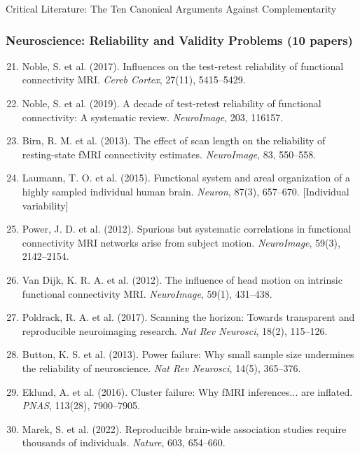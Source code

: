 \begin{chapter}{Critical Literature: The Ten Canonical Arguments Against Complementarity}
\subsubsection{Neuroscience: Reliability and Validity Problems (10 papers)}

\begin{enumerate}
    \setcounter{enumi}{20}
    \item Noble, S. et al. (2017). Influences on the test-retest reliability of functional connectivity MRI. \textit{Cereb Cortex}, 27(11), 5415--5429.

    \item Noble, S. et al. (2019). A decade of test-retest reliability of functional connectivity: A systematic review. \textit{NeuroImage}, 203, 116157.

    \item Birn, R. M. et al. (2013). The effect of scan length on the reliability of resting-state fMRI connectivity estimates. \textit{NeuroImage}, 83, 550--558.

    \item Laumann, T. O. et al. (2015). Functional system and areal organization of a highly sampled individual human brain. \textit{Neuron}, 87(3), 657--670. [Individual variability]

    \item Power, J. D. et al. (2012). Spurious but systematic correlations in functional connectivity MRI networks arise from subject motion. \textit{NeuroImage}, 59(3), 2142--2154.

    \item Van Dijk, K. R. A. et al. (2012). The influence of head motion on intrinsic functional connectivity MRI. \textit{NeuroImage}, 59(1), 431--438.

    \item Poldrack, R. A. et al. (2017). Scanning the horizon: Towards transparent and reproducible neuroimaging research. \textit{Nat Rev Neurosci}, 18(2), 115--126.

    \item Button, K. S. et al. (2013). Power failure: Why small sample size undermines the reliability of neuroscience. \textit{Nat Rev Neurosci}, 14(5), 365--376.

    \item Eklund, A. et al. (2016). Cluster failure: Why fMRI inferences... are inflated. \textit{PNAS}, 113(28), 7900--7905.

    \item Marek, S. et al. (2022). Reproducible brain-wide association studies require thousands of individuals. \textit{Nature}, 603, 654--660.
\end{enumerate}


\end{chapter}
